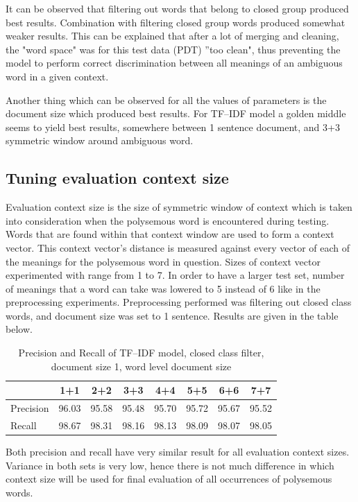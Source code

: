 It can be observed that filtering out words that belong to closed group produced 
best results. Combination with filtering closed group words produced somewhat weaker results. This can be explained that after a lot of merging and cleaning, the "word space" was for this test data (PDT) ''too clean", thus preventing the model to perform correct discrimination between all 
meanings of an ambiguous word in a given context.

Another thing which can be observed for all the values of parameters is the document size which 
produced best results. For TF--IDF model a golden middle seems to yield best results, somewhere 
between 1 sentence document, and 3+3 symmetric window around ambiguous word.


\subsection{Tuning evaluation context size}
Evaluation context size is the size of symmetric window of context which is taken into consideration 
when the polysemous word is encountered during testing. Words that are found within that context
window are used to form a context vector. This context vector's distance is measured against every
vector of each  of the meanings for the polysemous word in question. Sizes of context vector 
experimented with range from 1 to 7. In order to have a larger test set, number of meanings that 
a word can take was lowered to 5 instead of 6 like in the preprocessing experiments. Preprocessing
performed was filtering out closed class words, and document size was set to 1 sentence. 
Results are given 
in the table below. 

\begin{table}[h!]
\begin{tabular}{ l | c c c c c c c}
    &  1+1 & 2+2 & 3+3 & 4+4 & 5+5 & 6+6 & 7+7 \\
\hline
Precision &96.03 &95.58   & 95.48  &  95.70 & 95.72  & 95.67  & 95.52  \\
\hline
Recall  & 98.67 & 98.31  & 98.16  & 98.13  & 98.09  & 98.07  &  98.05 \\
\end{tabular}
\caption{Precision and Recall of TF--IDF model, closed class filter, document size 1, word level document size}
\end{table} 

Both precision and recall have very similar result for all evaluation context sizes. Variance in both sets 
is very low, hence there is not much difference in which context size will be used for final evaluation
of all occurrences of polysemous words.


